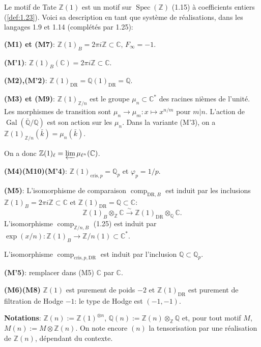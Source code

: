 \documentclass[12pt,a4paper]{article}
\theoremstyle{plain}
\theoremstyle{definition}
\theoremstyle{remark}
\DeclareMathOperator{\Spec}{Spec}
\DeclareMathOperator{\Gal}{Gal}
\providecommand{\Gal}{\operatorname{Gal}}
\providecommand{\Spec}{\operatorname{Spec}}
\providecommand{\limproj}{\varprojlim}
\providecommand{\DR}{\mathrm{DR}}
\providecommand{\cris}{\mathrm{cris}}
\providecommand{\comp}{\operatorname{comp}}
\begin{document}
Le motif de Tate $\mathbb{Z}(1)$ est un motif sur $\Spec(\mathbb{Z})$ (1.15) \`a
coefficients entiers (\ref{def:1.23}). Voici sa description en tant que syst\`eme de
r\'ealisations, dans les langages 1.9 et 1.14 (compl\'et\'es par 1.25):

\textbf{(M1) et (M7)}: $\mathbb{Z}(1)_B = 2\pi i \mathbb{Z} \subset \mathbb{C}$,
$F_\infty = -1$.

\textbf{(M'1)}: $\mathbb{Z}(1)_B(\mathbb{C}) = 2\pi i \mathbb{Z} \subset \mathbb{C}$.

\textbf{(M2),(M'2)}: $\mathbb{Z}(1)_{\DR} = \mathbb{Q}(1)_{\DR} = \mathbb{Q}$.

\textbf{(M3) et (M9)}: $\mathbb{Z}(1)_{\mathbb{Z}/n}$ est le groupe $\mu_n \subset
\mathbb{C}^*$ des racines ni\`emes de l'unit\'e. Les morphismes de transition sont
$\mu_n \to \mu_m: x \mapsto x^{n/m}$ pour $m|n$. L'action de
$\Gal(\overline{\mathbb{Q}}/\mathbb{Q})$ est son action sur les $\mu_n$. Dans la variante
(M'3), on a $\mathbb{Z}(1)_{\mathbb{Z}/n}(\bar{k}) = \mu_n(\bar{k})$.

On a donc $\mathbb{Z}(1)_\ell = \limproj \mu_{\ell^n}(\mathbb{C})$.

\textbf{(M4)(M10)(M'4)}: $\mathbb{Z}(1)_{\cris,p} = \mathbb{Q}_p$ et $\varphi_p = 1/p$.

\textbf{(M5)}: L'isomorphisme de comparaison $\comp_{\DR,B}$ est induit par les inclusions
$\mathbb{Z}(1)_B = 2\pi i \mathbb{Z} \subset \mathbb{C}$ et
$\mathbb{Z}(1)_{\DR} = \mathbb{Q} \subset \mathbb{C}$:
\[
\mathbb{Z}(1)_B \otimes_{\mathbb{Z}} \mathbb{C} \xrightarrow{\sim}
\mathbb{Z}(1)_{\DR} \otimes_{\mathbb{Q}} \mathbb{C}.
\]
L'isomorphisme $\comp_{\mathbb{Z}/n,B}$ (1.25) est induit par
$\exp(x/n): \mathbb{Z}(1)_B \to \mathbb{Z}/n(1) \subset \mathbb{C}^*$.

L'isomorphisme $\comp_{\cris,p,\DR}$ est induit par l'inclusion $\mathbb{Q} \subset
\mathbb{Q}_p$.

\textbf{(M'5)}: remplacer dans (M5) $\mathbb{C}$ par $\mathbb{C}$.

\textbf{(M6)(M8)} $\mathbb{Z}(1)$ est purement de poids $-2$ et
$\mathbb{Z}(1)_{\DR}$ est purement de filtration de Hodge $-1$: le type de Hodge est
$(-1,-1)$.

\textbf{Notations}: $\mathbb{Z}(n) := \mathbb{Z}(1)^{\otimes n}$,
$\mathbb{Q}(n) := \mathbb{Z}(n) \otimes_{\mathbb{Z}} \mathbb{Q}$ et, pour tout motif $M$,
$M(n) := M \otimes \mathbb{Z}(n)$. On note encore $(n)$ la tensorisation par une
r\'ealisation de $\mathbb{Z}(n)$, d\'ependant du contexte.
\end{document}
